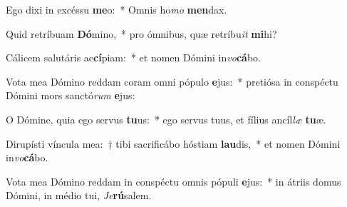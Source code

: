 \item Ego dixi in excéssu \textbf{me}o:~* Omnis ho\textit{mo} \textbf{men}dax.
\item Quid retríbuam \textbf{Dó}mino,~* pro ómnibus, quæ retríbu\textit{it} \textbf{mi}hi?
\item Cálicem salutáris ac\textbf{cí}piam:~* et nomen Dómini in\textit{vo}\textbf{cá}bo.
\item Vota mea Dómino reddam coram omni pópulo \textbf{e}jus:~* pretiósa in conspéctu Dómini mors sanctó\textit{rum} \textbf{e}jus:
\item O Dómine, quia ego servus \textbf{tu}us:~* ego servus tuus, et fílius ancíl\textit{læ} \textbf{tu}æ.
\item Dirupísti víncula mea:~† tibi sacrificábo hóstiam \textbf{lau}dis,~* et nomen Dómini in\textit{vo}\textbf{cá}bo.
\item Vota mea Dómino reddam in conspéctu omnis pópuli \textbf{e}jus:~* in átriis domus Dómini, in médio tui, \textit{Je}\textbf{rú}salem.
